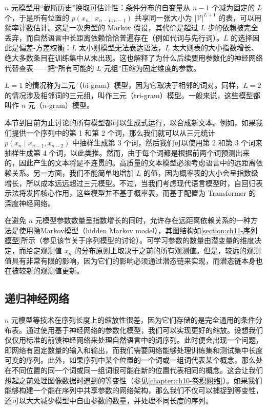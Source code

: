 \documentclass[../../main.tex]{subfiles}
\begin{document}
\begin{remark}
$n$ 元模型用“截断历史”换取可估计性：条件分布的自变量从 $n-1$ 个减为固定的 $L$ 个，于是所有位置的 $p(x_n\mid x_{n-L:n-1})$ 共享同一张大小为 $|\mathcal{V}|^{L+1}$ 的表，可以用频率计数估计。这是一次典型的 Markov 假设，其代价是超过 $L$ 步的依赖被完全丢弃，而自然语言中长距离依赖恰恰普遍存在（例如代词与先行词）。$L$ 的选择因此是偏差-方差权衡：$L$ 太小则模型无法表达语法，$L$ 太大则表的大小指数增长、绝大多数条目在训练集中从未出现。这也解释了为什么后续要用参数化的神经网络代替查表——把“所有可能的 $L$ 元组”压缩为固定维度的参数。
\end{remark}

$L=1$ 的情况称为二元（bi-gram）模型，因为它取决于相邻的词对。同样，$L=2$ 的情况涉及相邻词的三元组，叫作三元（tri-gram）模型。一般来说，这些模型都叫作 $n$ 元（$n$-gram）模型。

本节到目前为止讨论的所有模型都可以生成式运行，以合成新文本。例如，如果我们提供一个序列中的第 1 和第 2 个词，那么我们就可以从三元统计 $p(x_n\mid x_{n-1},x_{n-2})$ 中抽样生成第 3 个词，然后我们可以使用第 2 和第 3 个词来抽样生成第 4 个词，以此类推。然而，由于每个词都是根据前两个词预测出来的，因此产生的文本将是不连贯的。高质量的文本模型必须考虑语言中的远距离依赖关系。另一方面，我们不能简单地增加 $L$ 的值，因为概率表的大小会呈指数级增长，所以成本远远超过三元模型。不过，当我们考虑现代语言模型时，自回归表示法将发挥核心作用，这些模型并不基于概率表，而基于配置为 Transformer 的深度神经网络。

在避免 $n$ 元模型参数数量呈指数增长的同时，允许存在远距离依赖关系的一种方法是使用隐Markov模型（hidden Markov model），其图结构如\cref{section:ch11-序列模型}所示（参见该节关于序列模型的讨论）。可学习参数的数量由潜变量的维度决定，而给定观测值 $x_n$ 的分布原则上取决于之前的所有观测值。但是，较远的观测值具有非常有限的影响，因为它们的影响必须通过潜态链来实现，而潜态链本身也在被较新的观测值更新。

\subsection{递归神经网络}\label{subsection:ch12-递归神经网络}

$n$ 元模型等技术在序列长度上的缩放性很差，因为它们存储的是完全通用的条件分布表。通过使用基于神经网络的参数化模型，我们可以实现更好的缩放。设想我们仅仅用标准的前馈神经网络来处理自然语言中的词序列。此时便会出现一个问题，即网络有固定数量的输入和输出，而我们需要网络能够处理训练集和测试集中长度可变的序列。此外，如果序列中某个位置的一个词或一组词代表某个概念，那么处在不同位置的同一个词或同一组词很可能在新的位置代表相同的概念。这会让我们想起之前处理图像数据时遇到的等变性（参见\cref{chapter:ch10-卷积网络}）。如果我们能够构建一个能在序列中共享参数的网络架构，那么我们不仅可以捕捉到等变性，还可以大大减少模型中自由参数的数量，并处理不同长度的序列。
\end{document}
